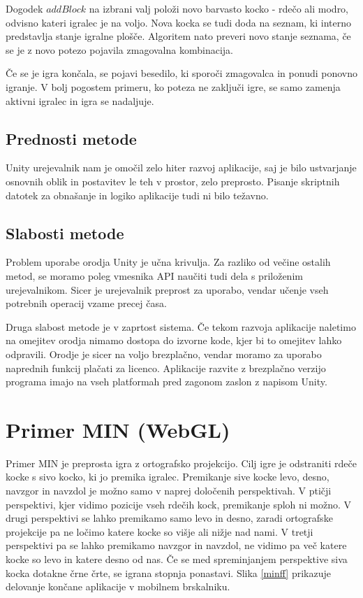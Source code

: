 Dogodek $addBlock$ na izbrani valj položi novo barvasto kocko - rdečo ali modro, odvisno kateri igralec je na voljo. Nova kocka se tudi doda na seznam, ki interno predstavlja stanje igralne plošče. Algoritem nato preveri novo stanje seznama, če se je z novo potezo pojavila zmagovalna kombinacija.

Če se je igra končala, se pojavi besedilo, ki sporoči zmagovalca in ponudi ponovno igranje. V bolj pogostem primeru, ko poteza ne zaključi igre, se samo zamenja aktivni igralec in igra se nadaljuje. 

\subsection{Prednosti metode}

Unity urejevalnik nam je omočil zelo hiter razvoj aplikacije, saj je bilo ustvarjanje osnovnih oblik in postavitev le teh v prostor, zelo preprosto. Pisanje skriptnih datotek za obnašanje in logiko aplikacije tudi ni bilo težavno.

\subsection{Slabosti metode}

Problem uporabe orodja Unity je učna krivulja. Za razliko od večine ostalih metod, se moramo poleg vmesnika API naučiti tudi dela s priloženim urejevalnikom. Sicer je urejevalnik preprost za uporabo, vendar učenje vseh potrebnih operacij vzame precej časa.

Druga slabost metode je v zaprtost sistema. Če tekom razvoja aplikacije naletimo na omejitev orodja nimamo dostopa do izvorne kode, kjer bi to omejitev lahko odpravili. Orodje je sicer na voljo brezplačno, vendar moramo za uporabo naprednih funkcij plačati za licenco. Aplikacije razvite z brezplačno verzijo programa imajo na vseh platformah pred zagonom zaslon z napisom Unity. 

\section{Primer MIN (WebGL)}

Primer MIN je preprosta igra z ortografsko projekcijo. Cilj igre je odstraniti rdeče kocke s sivo kocko, ki jo premika igralec. Premikanje sive kocke levo, desno, navzgor in navzdol je možno samo v naprej določenih perspektivah. V ptičji perspektivi, kjer vidimo pozicije vseh rdečih kock, premikanje sploh ni možno. V drugi perspektivi se lahko premikamo samo levo in desno, zaradi ortografske projekcije pa ne ločimo katere kocke so višje ali nižje nad nami. V tretji perspektivi pa se lahko premikamo navzgor in navzdol, ne vidimo pa več katere kocke so levo in katere desno od nas. Če se med spreminjanjem perspektive siva kocka dotakne črne črte, se igrana stopnja ponastavi. Slika \ref{minff} prikazuje delovanje končane aplikacije v mobilnem brskalniku.

